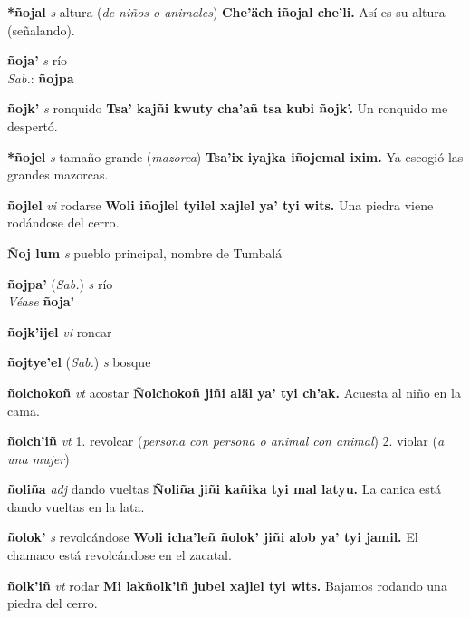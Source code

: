 \documentclass[10pt]{scrbook}
\newcommand{\entry}[1]{\textbf{#1}}
\newcommand{\onedefinition}[1]{#1.}
\newcommand{\partofspeech}[1]{\textit{#1}}
\newcommand{\spanishtranslation}[1]{#1}
\newcommand{\clarification}[1]{(\textit{#1})}
\newcommand{\cholexample}[1]{\textbf{#1}}
\newcommand{\exampletranslation}[1]{#1}
\newcommand{\dialectvariant}[1]{\\\textit{#1}:}
\newcommand{\dialectword}[1]{\textbf{#1}}
\newcommand{\alsosee}[1]{\\\textit{Véase} \textbf{#1}}
\newcommand{\relevantdialect}[1]{(\textit{#1})}
\begin{document}
\begin{multicols}{2}
\entry{*ñojal}
\partofspeech{s}
\spanishtranslation{altura}
\clarification{de niños o animales}
\cholexample{Che'äch iñojal che'li.}
\exampletranslation{Así es su altura (señalando).}

\entry{ñoja'}
\partofspeech{s}
\spanishtranslation{río}
\dialectvariant{Sab.}
\dialectword{ñojpa}

\entry{ñojk'}
\partofspeech{s}
\spanishtranslation{ronquido}
\cholexample{Tsa' kajñi kwuty cha'añ tsa kubi ñojk'.}
\exampletranslation{Un ronquido me despertó.}

\entry{*ñojel}
\partofspeech{s}
\spanishtranslation{tamaño grande}
\clarification{mazorca}
\cholexample{Tsa'ix iyajka iñojemal ixim.}
\exampletranslation{Ya escogió las grandes mazorcas.}

\entry{ñojlel}
\partofspeech{vi}
\spanishtranslation{rodarse}
\cholexample{Woli iñojlel tyilel xajlel ya' tyi wits.}
\exampletranslation{Una piedra viene rodándose del cerro.}

\entry{Ñoj lum}
\partofspeech{s}
\spanishtranslation{pueblo principal, nombre de Tumbalá}

\entry{ñojpa'}
\relevantdialect{Sab.}
\partofspeech{s}
\spanishtranslation{río}
\alsosee{ñoja'}

\entry{ñojk'ijel}
\partofspeech{vi}
\spanishtranslation{roncar}

\entry{ñojtye'el}
\relevantdialect{Sab.}
\partofspeech{s}
\spanishtranslation{bosque}

\entry{ñolchokoñ}
\partofspeech{vt}
\spanishtranslation{acostar}
\cholexample{Ñolchokoñ jiñi aläl ya' tyi ch'ak.}
\exampletranslation{Acuesta al niño en la cama.}

\entry{ñolch'iñ}
\partofspeech{vt}
\onedefinition{1}
\spanishtranslation{revolcar}
\clarification{persona con persona o animal con animal}
\onedefinition{2}
\spanishtranslation{violar}
\clarification{a una mujer}

\entry{ñoliña}
\partofspeech{adj}
\spanishtranslation{dando vueltas}
\cholexample{Ñoliña jiñi kañika tyi mal latyu.}
\exampletranslation{La canica está dando vueltas en la lata.}

\entry{ñolok'}
\partofspeech{s}
\spanishtranslation{revolcándose}
\cholexample{Woli icha'leñ ñolok' jiñi alob ya' tyi jamil.}
\exampletranslation{El chamaco está revolcándose en el zacatal.}

\entry{ñolk'iñ}
\partofspeech{vt}
\spanishtranslation{rodar}
\cholexample{Mi lakñolk'iñ jubel xajlel tyi wits.}
\exampletranslation{Bajamos rodando una piedra del cerro.}


\end{multicols}
\end{document}
